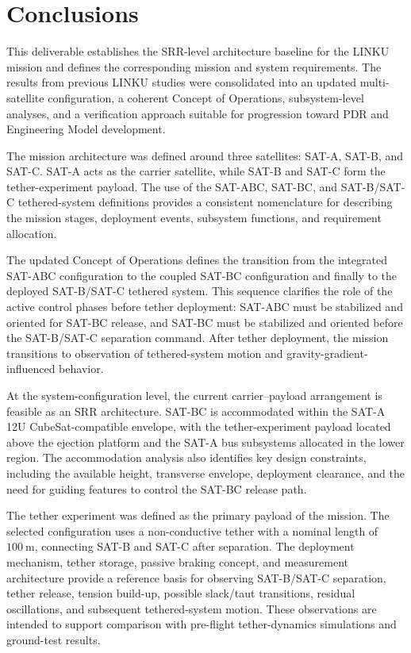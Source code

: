 \chapter{Conclusions}
\label{ch:conclusions}

This deliverable establishes the SRR-level architecture baseline for the LINKU mission and defines the corresponding mission and system requirements. The results from previous LINKU studies were consolidated into an updated multi-satellite configuration, a coherent Concept of Operations, subsystem-level analyses, and a verification approach suitable for progression toward PDR and Engineering Model development.

The mission architecture was defined around three satellites: SAT-A, SAT-B, and SAT-C. SAT-A acts as the carrier satellite, while SAT-B and SAT-C form the tether-experiment payload. The use of the SAT-ABC, SAT-BC, and SAT-B/SAT-C tethered-system definitions provides a consistent nomenclature for describing the mission stages, deployment events, subsystem functions, and requirement allocation.

The updated Concept of Operations defines the transition from the integrated SAT-ABC configuration to the coupled SAT-BC configuration and finally to the deployed SAT-B/SAT-C tethered system. This sequence clarifies the role of the active control phases before tether deployment: SAT-ABC must be stabilized and oriented for SAT-BC release, and SAT-BC must be stabilized and oriented before the SAT-B/SAT-C separation command. After tether deployment, the mission transitions to observation of tethered-system motion and gravity-gradient-influenced behavior.

At the system-configuration level, the current carrier--payload arrangement is feasible as an SRR architecture. SAT-BC is accommodated within the SAT-A 12U CubeSat-compatible envelope, with the tether-experiment payload located above the ejection platform and the SAT-A bus subsystems allocated in the lower region. The accommodation analysis also identifies key design constraints, including the available height, transverse envelope, deployment clearance, and the need for guiding features to control the SAT-BC release path.

The tether experiment was defined as the primary payload of the mission. The selected configuration uses a non-conductive tether with a nominal length of \(100~\mathrm{m}\), connecting SAT-B and SAT-C after separation. The deployment mechanism, tether storage, passive braking concept, and measurement architecture provide a reference basis for observing SAT-B/SAT-C separation, tether release, tension build-up, possible slack/taut transitions, residual oscillations, and subsequent tethered-system motion. These observations are intended to support comparison with pre-flight tether-dynamics simulations and ground-test results.

